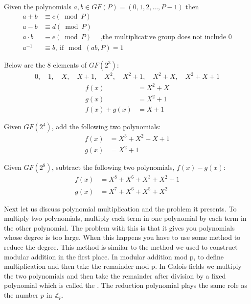 \begin{rem} Given the polynomials $a,b \in  GF(P) = (0,1,2,...,P-1)$ then 
\begin{align*} 		
		a + b &\equiv c (\bmod P)\\
		a - b &\equiv d (\bmod P)\\
		a \cdot b &\equiv e (\bmod P) \quad \text{ ,the multiplicative group does not include 0}\\
		a^{-1} &\equiv b, \mathrm{~if~} \bmod (ab, P) = 1
\end{align*}
\end{rem}
\begin{eg} Below are the 8 elements of $GF(2^3)$:
\begin{align*}
0, \quad 1, \quad X, \quad X +1, \quad X^2, \quad X^2+1, \quad X^2 + X, \quad X^2 + X + 1
 \end{align*}
\begin{align*}
	f(x) &= X^2 + X\\
	g(x) &= X^2  + 1\\
           f(x) + g(x) &= X  + 1
 \end{align*}
\end{eg}
\begin{exer} Given $GF(2^4)$, add the following two polynomials:
\begin{align*}
	f(x) &= X^3 + X^2 + X + 1\\
	g(x) &= X^2  + 1
 \end{align*}
\end{exer}

\begin{exer} Given $GF(2^8)$, subtract the following two polynomials, $f(x) - g(x)$:
\begin{align*}	
	f(x) &= X^8 +         X^6 +          X^3 + X^2 + 1\\
	g(x) &=        X^7 + X^6 + X^5 +          X^2
\end{align*}
\end{exer}
Next let us discuss polynomial multiplication and the problem it presents. To multiply two polynomials, multiply each term in one polynomial by each term in the other polynomial. The problem with this is that it gives you polynomials whose degree is too large. When this happens you have to use some method to reduce the degree. This method is similar to the method we used to construct modular addition in the first place.  In modular addition mod p, to define multiplication and then take the remainder mod p.  In Galois fields we multiply the two polynomials and then take the remainder after division by a fixed polynomial which is called the .  The reduction polynomial plays the same role as the number $p$ in $\mathbb{Z}_p$.

